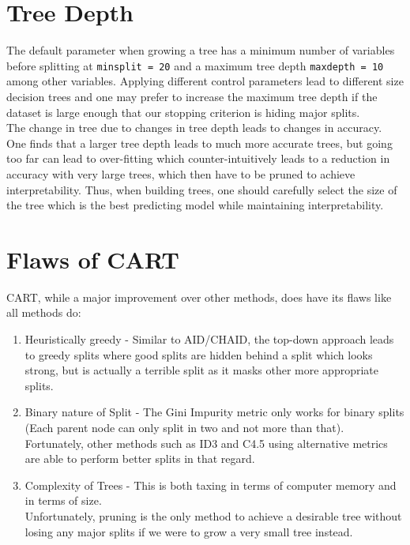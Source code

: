 \documentclass[11pt,a4paper]{report}
\begin{document}
\section{Tree Depth}
The default parameter when growing a tree has a minimum number of variables before splitting at \texttt{minsplit = 20} and a maximum tree depth \texttt{maxdepth = 10} among other variables.
Applying different control parameters lead to different size decision trees and one may prefer to increase the maximum tree depth if the dataset is large enough that our stopping criterion is hiding major splits.
\medskip\\
The change in tree due to changes in tree depth leads to changes in accuracy. 
One finds that a larger tree depth leads to much more accurate trees, but going too far can lead to over-fitting which counter-intuitively leads to a reduction in accuracy with very large trees, which then have to be pruned to achieve interpretability.
Thus, when building trees, one should carefully select the size of the tree which is the best predicting model while maintaining interpretability.


\section{Flaws of CART}
CART, while a major improvement over other methods, does have its flaws like all methods do:
\begin{enumerate}
    \item Heuristically greedy - Similar to AID/CHAID, the top-down approach leads to greedy splits where good splits are hidden behind a split which looks strong, but is actually a terrible split as it masks other more appropriate splits.
    
    \item Binary nature of Split - The Gini Impurity metric only works for binary splits (Each parent node can only split in two and not more than that).\\
    Fortunately, other methods such as ID3 and C4.5 using alternative metrics are able to perform better splits in that regard.
    
    \item Complexity of Trees - This is both taxing in terms of computer memory and in terms of size. \\
    Unfortunately, pruning is the only method to achieve a desirable tree without losing any major splits if we were to grow a very small tree instead.
\end{enumerate}
\end{document}
